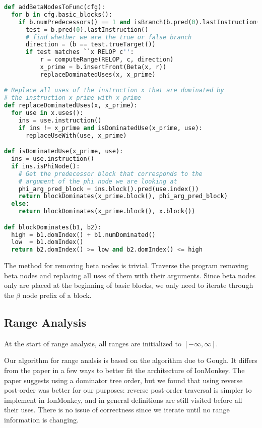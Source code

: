 \documentclass{article}
\begin{document}
\begin{lstlisting}[language=Python,
                   caption={Pseudocode algorithm for inserting beta nodes},
                   label={lst:add_betas}]
def addBetaNodesToFunc(cfg):
  for b in cfg.basic_blocks():
    if b.numPredecessors() == 1 and isBranch(b.pred(0).lastInstruction()):
      test = b.pred(0).lastInstruction()
      # find whether we are the true or false branch
      direction = (b == test.trueTarget())
      if test matches ``x RELOP c'':
          r = computeRange(RELOP, c, direction)
          x_prime = b.insertFront(Beta(x, r))
          replaceDominatedUses(x, x_prime)

# Replace all uses of the instruction x that are dominated by
# the instruction x_prime with x_prime
def replaceDominatedUses(x, x_prime):
  for use in x.uses():
    ins = use.instruction()
    if ins != x_prime and isDominatedUse(x_prime, use):
      replaceUseWith(use, x_prime)

def isDominatedUse(x_prime, use):
  ins = use.instruction()
  if ins.isPhiNode():
    # Get the predecessor block that corresponds to the
    # argument of the phi node we are looking at
    phi_arg_pred_block = ins.block().pred(use.index())
    return blockDominates(x_prime.block(), phi_arg_pred_block)
  else:
    return blockDominates(x_prime.block(), x.block())

def blockDominates(b1, b2):
  high = b1.domIndex() + b1.numDominated()
  low  = b1.domIndex()
  return b2.domIndex() >= low and b2.domIndex() <= high
\end{lstlisting}

The method for removing beta nodes is trivial. Traverse the program
removing beta nodes and replacing all uses of them with their
arguments. Since beta nodes only are placed at the beginning of basic
blocks, we only need to iterate through the $\beta$ node prefix of a
block.

\subsection{Range Analysis}

At the start of range analysis, all ranges are initialized to
$[-\infty, \infty]$.

Our algorithm for range analsis is based on the algorithm due to Gough. It
differs from the paper in a few ways to better fit the architecture of
IonMonkey. The paper suggests using a dominator tree order, but we found that
using reverse post-order was better for our purposes: reverse post-order
traversal is simpler to implement in IonMonkey, and in general definitions are
still visited before all their uses. There is no issue of correctness since we
iterate until no range information is changing.
\end{document}
